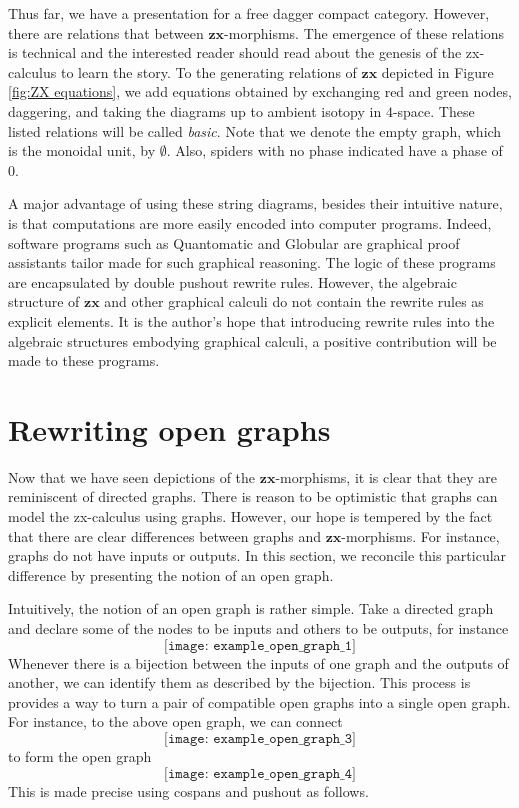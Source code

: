 \documentclass[11pt]{amsart}
\theoremstyle{definition}
\begin{document}
Thus far, we have a presentation for a free dagger compact category. However, there are relations that between $\mathbf{zx}$-morphisms.  The emergence of these relations is technical and the interested reader should read about the genesis of the zx-calculus \cite{CoeckeDuncan_QuantumObsFullPaper} to learn the story. To the generating relations of $\mathbf{zx}$ depicted in Figure \ref{fig:ZX equations}, we add equations obtained by exchanging red and green nodes, daggering, and taking the diagrams up to ambient isotopy in $4$-space. These listed relations will be called \emph{basic}. Note that we denote the empty graph, which is the monoidal unit, by $\emptyset$. Also, spiders with no phase indicated have a phase of $0$. 

A major advantage of using these string diagrams, besides their intuitive nature, is that computations are more easily encoded into computer programs.  Indeed, software programs such as Quantomatic \cite{BarKissingerVicary_Globular,DixonDuncanKissinger_QuantomaticWebsite} and Globular \cite{BarKissingerVicary_Globular} are graphical proof assistants tailor made for such graphical reasoning.  The logic of these programs are encapsulated by double pushout rewrite rules.  However, the algebraic structure of $\mathbf{zx}$ and other graphical calculi do not contain the rewrite rules as explicit elements.  It is the author's hope that introducing rewrite rules into the algebraic structures embodying graphical calculi, a positive contribution will be made to these programs.  

\section{Rewriting open graphs}
\label{sec:RewritingOpenGraphs}

Now that we have seen depictions of the $\mathbf{zx}$-morphisms, it is clear that they are reminiscent of directed graphs.  There is reason to be optimistic that graphs can model the zx-calculus using graphs.  However, our hope is tempered by the fact that there are clear differences between graphs and $\mathbf{zx}$-morphisms.  For instance, graphs do not have inputs or outputs. In this section, we reconcile this particular difference by presenting the notion of an open graph.

Intuitively, the notion of an open graph is rather simple.  Take a directed graph and declare some of the nodes to be inputs and others to be outputs, for instance
\[
\texttt{[image: example\_open\_graph\_1]}
\]
Whenever there is a bijection between the inputs of one graph and the outputs of another, we can identify them as described by the bijection.  This process is provides a way to turn a pair of compatible open graphs into a single open graph.  For instance, to the above open graph, we can connect 
\[
	\texttt{[image: example\_open\_graph\_3]}
\]
to form the open graph
\[
	\texttt{[image: example\_open\_graph\_4]}
\]
This is made precise using cospans and pushout as follows. 
\end{document}
